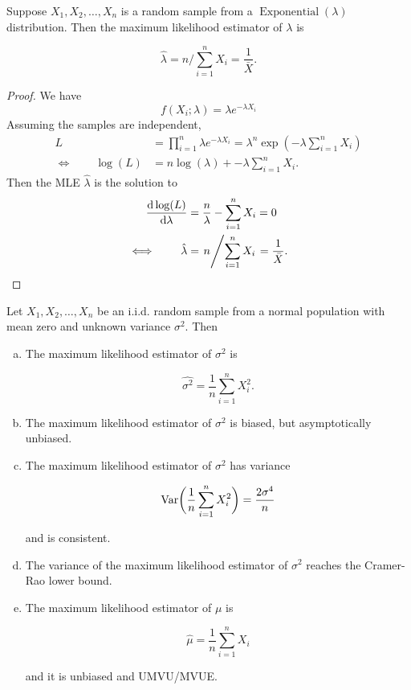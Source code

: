 \begin{proposition} Suppose \(X_1, X_2, \ldots, X_n\) is a random sample from a \(\operatorname{Exponential}(\lambda)\) distribution. Then the maximum likelihood estimator of \(\lambda\) is

\[
\hat{\lambda} = n / \sum_{i=1}^n X_i = \frac{1}{\bar{X}}.
\]

\end{proposition}

\begin{proof} We have
\[
f(X_i; \lambda) = \lambda e^{-\lambda X_i}
\]
Assuming the samples are independent,
\begin{align*}
L & = \prod_{i=1}^n \lambda e^{-\lambda X_i} = \lambda^n \exp(-\lambda \sum_{i=1}^n X_i)
\\ \iff \qquad  \log(L) & = n \log(\lambda) + -\lambda \sum_{i=1}^n X_i.
\end{align*}
Then the MLE \(\hat{\lambda}\) is the solution to
\begin{align*}
 \deriv{\log(L)}{\lambda} & = \frac{n}{\lambda} - \sum_{i=1}^n X_i  = 0
\\ \iff  \qquad \hat{\lambda} & = \left. n \middle/ \sum_{i=1}^n X_i  \right.= \frac{1}{\bar{X}}.
\end{align*}

\end{proof}

\begin{proposition} Let \(X_1, X_2, \ldots, X_n\) be an i.i.d. random sample from a normal population with mean zero and unknown variance \(\sigma^2\). Then

\begin{enumerate}[(a)]

\item The maximum likelihood estimator of \(\sigma^2\) is

\[
\hat{\sigma^2} = \frac{1}{n} \sum_{i=1}^n X_i^2.
\]

\item The maximum likelihood estimator of \(\sigma^2\) is biased, but asymptotically unbiased.

\item The maximum likelihood estimator of \(\sigma^2\) has variance

\[
\Var \bigg( \frac{1}{n} \sum_{i=1}^n X_i^2 \bigg)  =  \frac{2 \sigma^4}{n}
\]

and is consistent.

\item The variance of the maximum likelihood estimator of \(\sigma^2\) reaches the Cramer-Rao lower bound.

\item The maximum likelihood estimator of \(\mu\) is

\[
\hat{\mu} = \frac{1}{n} \sum_{i=1}^n X_i
\]

and it is unbiased and UMVU/MVUE.

\end{enumerate}

\end{proposition}

